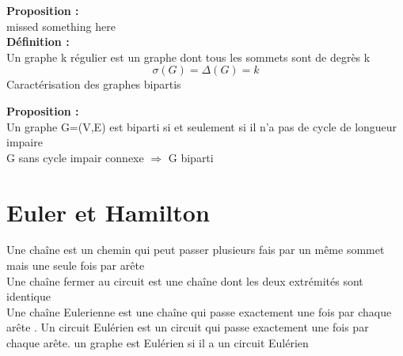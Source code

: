 \documentclass{report}
\newcommand{\deffinition}{\textcolor[rgb]{0.65,0,0.7}{Définition : }}
\newcommand{\Def}{\textbf{\deffinition}}
\newcommand{\propo}{\textcolor[rgb]{0,0,0.75}{Proposition : }}
\newcommand{\Propo}{\textbf{\propo}}
\begin{document}
\Propo\\

missed something here\\

\Def\\
Un graphe k régulier est un graphe dont tous les sommets sont de degrès k\\
$$\sigma(G)=\Delta(G)=k$$
\newpage
Caractérisation des graphes bipartis

\Propo\\
Un graphe G=(V,E) est biparti si et seulement si il n'a pas de cycle de longueur impaire\\
G sans cycle impair connexe $\Rightarrow$ G biparti
\section{Euler et Hamilton}
Une chaîne est un chemin qui peut passer plusieurs fais par un même sommet mais une seule fois par arête\\
Une chaîne fermer au circuit est une chaîne dont les deux extrémités sont identique\\
Une chaîne Eulerienne est une chaîne qui passe exactement une fois par chaque arête . Un circuit Eulérien est un circuit qui passe exactement une fois par chaque arête. un graphe est Eulérien si il a un circuit Eulérien\\
\end{document}
